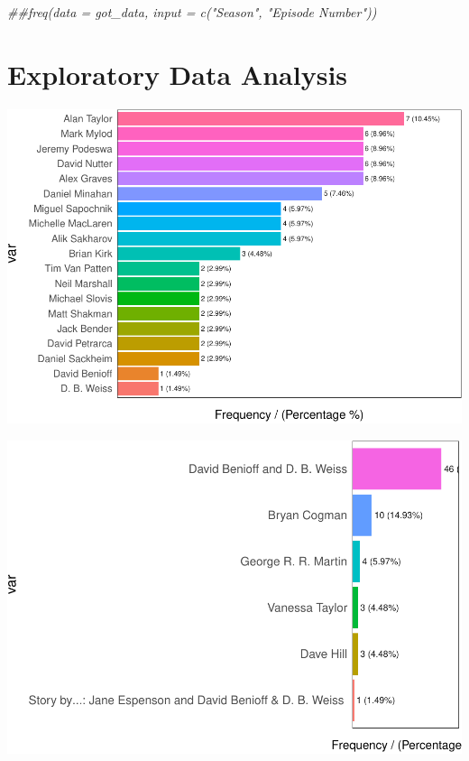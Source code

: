 \documentclass[]{article}
\newenvironment{Shaded}{\begin{snugshade}}{\end{snugshade}}
\newcommand{\CommentTok}[1]{\textcolor[rgb]{0.56,0.35,0.01}{\textit{#1}}}
\newcommand{\KeywordTok}[1]{\textcolor[rgb]{0.13,0.29,0.53}{\textbf{#1}}}
\newcommand{\NormalTok}[1]{#1}
\newcommand{\OperatorTok}[1]{\textcolor[rgb]{0.81,0.36,0.00}{\textbf{#1}}}
\newcommand{\StringTok}[1]{\textcolor[rgb]{0.31,0.60,0.02}{#1}}
\begin{document}
\begin{Shaded}
\begin{Highlighting}[]
\CommentTok{##freq(data = got_data, input = c("Season", "Episode Number"))}
\end{Highlighting}
\end{Shaded}

\hypertarget{exploratory-data-analysis}{%
\section{Exploratory Data Analysis}\label{exploratory-data-analysis}}

\begin{Shaded}
\end{Shaded}

\includegraphics{FinalProject_files/figure-latex/unnamed-chunk-10-1.pdf}

\begin{Shaded}
\end{Shaded}

\includegraphics{FinalProject_files/figure-latex/unnamed-chunk-11-1.pdf}
\end{document}

